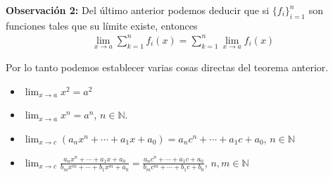 \documentclass[12pt]{book}
\begin{document}
\textbf{Observación 2:} Del último anterior podemos deducir que si $\{f_i\}_{i=1}^n$ son funciones tales que su límite existe, entonces
\begin{align*}
    \lim_{x\to a}\sum_{k=1}^n f_i(x)=\sum_{k=1}^n \lim_{x\to a} f_i(x)
\end{align*}

Por lo tanto podemos establecer varias cosas directas del teorema anterior.
\begin{itemize}
    \item $\displaystyle \lim_{x\to a}x^2=a^2$

    \item $\displaystyle \lim_{x\to a}x^n=a^n$,  $n \in \mathbb{N}$.

    \item $\displaystyle \lim_{x\to c}(a_nx^n+\cdots + a_1x+ a_0)=a_nc^n+\cdots + a_1c+ a_0$, $n \in \mathbb{N}$

    \item $\displaystyle \lim_{x\to c}\frac{a_nx^n+\cdots + a_1x+ a_0}{b_mx^m+\cdots + b_1x^m+ a_0}=\frac{a_nc^n+\cdots + a_1 c +a_0}{b_mc^m+\cdots + b_1c+b_0}$, $n,m \in \mathbb{N}$
\end{itemize}
\end{document}
